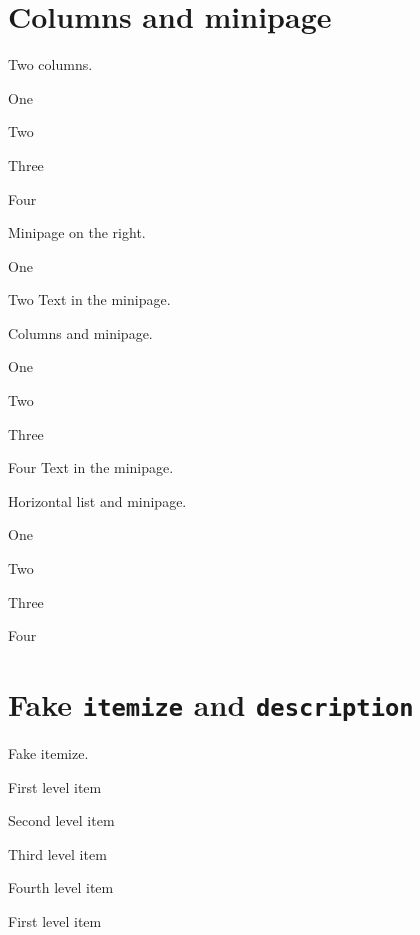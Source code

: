 \documentclass{article}
\begin{document}
\section{Columns and minipage}

Two columns.

\begin{enumext}[columns=2]
  \item One
  \item Two
  \item Three
  \item Four
\end{enumext}

Minipage on the right.

\begin{enumext}[mini-env=0.4\linewidth]
  \item One
  \item Two
  \miniright
    Text in the minipage.
\end{enumext}

Columns and minipage.

\begin{enumext}[columns=2, mini-env=0.4\linewidth]
  \item One
  \item Two
  \item Three
  \item Four
  \miniright
    Text in the minipage.
\end{enumext}

Horizontal list and minipage.

\begin{enumext*}[columns=2, mini-env=0.4\linewidth,
                 mini-right={Text in the minipage.}]
  \item One
  \item Two
  \item Three
  \item Four
\end{enumext*}

\section{Fake \texttt{itemize} and \texttt{description}}

Fake itemize.

\begin{enumext}[nosep, label=\textbullet]
  \item First level item
    \begin{enumext}[nosep, label=\textendash]
      \item Second level item
        \begin{enumext}[nosep, label=\textasteriskcentered]
          \item Third level item
            \begin{enumext}[nosep, label=\textperiodcentered]
              \item Fourth level item
            \end{enumext}
        \end{enumext}
    \end{enumext}
  \item First level item
\end{enumext}
\end{document}
